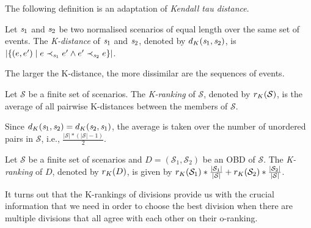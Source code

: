 The following definition is an adaptation of \emph{Kendall tau
distance}\cite{Kendall1938}.
\begin{definition}
\label{def-K-distance}
Let $\mathit{s}_1$ and $\mathit{s}_2$ be two normalised scenarios
of equal length over the same set of events.
The \emph{K-distance} of $\mathit{s}_1$ and $\mathit{s}_2$, denoted by
$d_K(\mathit{s}_1,\mathit{s}_2)$, is
$|\{(e,e')\;|\;e\prec_{\mathit{s}_1}e'\wedge e'\prec_{\mathit{s}_2}e\}|$.
\end{definition}
\noindent
The larger the K-distance, the more dissimilar are the sequences of
events.
\begin{definition}
\label{def-K-set-ranking}
Let $\mathcal{S}$ be a finite set of scenarios.
The \emph{K-ranking} of ${\mathcal{S}}$, denoted by $r_K(\mathcal{S})$,
is the average of all pairwise K-distances between the members of
$\mathcal{S}$.
\end{definition}
\noindent
Since $d_K(\mathit{s}_1,\mathit{s}_2)=d_K(\mathit{s}_2,\mathit{s}_1)$,
the average is taken over the number of unordered pairs in
${\mathcal{S}}$, i.e.,
$\frac{|{\mathcal{S}}|*(|{\mathcal{S}}|-1)}{2}$.
\begin{definition}
\label{def-K-ranking}
Let $\mathcal{S}$ be a finite set of scenarios and
$D=(\mathcal{S}_1,\mathcal{S}_2)$ be an OBD of
$\mathcal{S}$. The \emph{K-ranking} of $D$, denoted by
$r_K(D)$, is given by
$r_K(\mathcal{S}_1)*\frac{|\mathcal{S}_1|}{|\mathcal{S}|}+
r_K(\mathcal{S}_2)*\frac{|\mathcal{S}_2|}{|\mathcal{S}|}$.
\end{definition}
\noindent
It turns out that the K-rankings of divisions provide us with
the crucial information that we need in order to choose the best
division when there are multiple divisions that all agree
with each other on their o-ranking.
